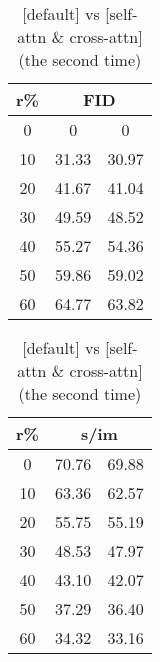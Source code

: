 \begin{table}[htp]
\caption{[default] vs [self-attn \& cross-attn] (the second time)}
\label{table:exp_1_4}
    \begin{minipage}{0.48\textwidth}
        \centering
        \begin{tabular}{|c||c|c|}
            \hline
            \multicolumn{1}{|c||}{r\%} & \multicolumn{2}{c|}{FID}\\
            \hline
            0 & 0 & 0 \\
            10 & 31.33 & 30.97 \\
            20 & 41.67 & 41.04 \\
            30 & 49.59 & 48.52 \\
            40 & 55.27 & 54.36 \\
            50 & 59.86 & 59.02 \\
            60 & 64.77 & 63.82 \\
            \hline
        \end{tabular}
    \end{minipage}
    \hfill
    \begin{minipage}{0.48\textwidth}
        \centering
        \begin{tabular}{|c||c|c|}
            \hline
            \multicolumn{1}{|c||}{r\%} & \multicolumn{2}{c|}{s/im}\\
            \hline
            0 & 70.76 & 69.88 \\
            10 & 63.36 & 62.57 \\
            20 & 55.75 & 55.19 \\
            30 & 48.53 & 47.97 \\
            40 & 43.10 & 42.07 \\
            50 & 37.29 & 36.40 \\
            60 & 34.32 & 33.16 \\
            \hline
        \end{tabular}
    \end{minipage}
\end{table}